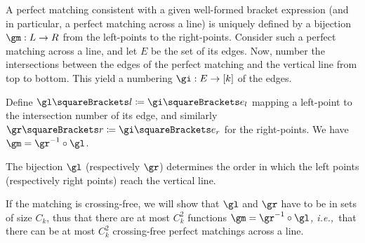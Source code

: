 \documentclass[10pt, a4paper, twoside]{basestyle}
\newcommand{\idest}{\emph{, i.e.,\ }}
\begin{document}
A perfect matching consistent with a given well-formed bracket expression (and in particular, a perfect
matching across a line) is uniquely defined by a bijection $\FunctionSpec \gm L R$ from
the left-points to the right-points. Consider such a perfect
matching across a line, and let $E$ be the set of its edges.
Now, number the intersections between the edges of the perfect matching and the vertical
line from top to bottom. This yield a numbering $\FunctionSpec \gi E {[k]}$ of the edges.

Define $\gl\of l \DefineAs \gi\of{e_l}$ mapping a left-point to the intersection number of its
edge, and similarly $\gr\of r \DefineAs \gi\of{e_r}$ for the right-points. We have
$\gm = \gr^{-1} \Compose \gl$.

The bijection $\gl$ (respectively $\gr$) determines the order in which the left points (respectively right points)
reach the vertical line.

If the matching is crossing-free, we will show that
$\gl$ and $\gr$ have to be in sets of size $C_k$, thus that there are at most $C_k^2$ functions
$\gm = \gr^{-1} \Compose \gl$\idest that there can be at most $C_k^2$ crossing-free perfect matchings across a line.
\end{document}
